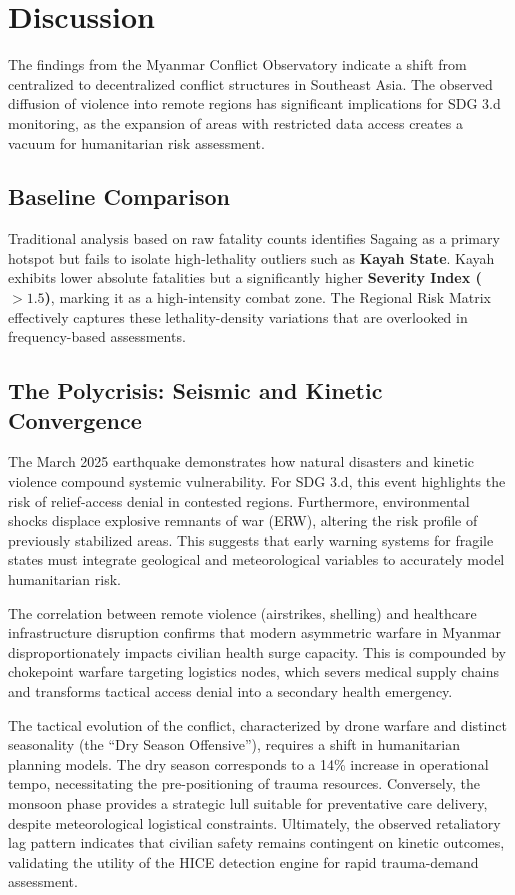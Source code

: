\documentclass[conference]{IEEEtran}
\begin{document}
\section{Discussion} 

The findings from the Myanmar Conflict Observatory indicate a shift from centralized to decentralized conflict structures in Southeast Asia. The observed diffusion of violence into remote regions has significant implications for SDG 3.d monitoring, as the expansion of areas with restricted data access creates a vacuum for humanitarian risk assessment. 

\subsection{Baseline Comparison}
Traditional analysis based on raw fatality counts identifies Sagaing as a primary hotspot but fails to isolate high-lethality outliers such as \textbf{Kayah State}. Kayah exhibits lower absolute fatalities but a significantly higher \textbf{Severity Index ($>1.5$)}, marking it as a high-intensity combat zone. The Regional Risk Matrix effectively captures these lethality-density variations that are overlooked in frequency-based assessments.

\subsection{The Polycrisis: Seismic and Kinetic Convergence}
The March 2025 earthquake demonstrates how natural disasters and kinetic violence compound systemic vulnerability. For SDG 3.d, this event highlights the risk of relief-access denial in contested regions. Furthermore, environmental shocks displace explosive remnants of war (ERW), altering the risk profile of previously stabilized areas. This suggests that early warning systems for fragile states must integrate geological and meteorological variables to accurately model humanitarian risk.

The correlation between remote violence (airstrikes, shelling) and healthcare infrastructure disruption confirms that modern asymmetric warfare in Myanmar disproportionately impacts civilian health surge capacity. This is compounded by chokepoint warfare targeting logistics nodes, which severs medical supply chains and transforms tactical access denial into a secondary health emergency.

The tactical evolution of the conflict, characterized by drone warfare and distinct seasonality (the ``Dry Season Offensive''), requires a shift in humanitarian planning models. The dry season corresponds to a 14\% increase in operational tempo, necessitating the pre-positioning of trauma resources. Conversely, the monsoon phase provides a strategic lull suitable for preventative care delivery, despite meteorological logistical constraints. Ultimately, the observed retaliatory lag pattern indicates that civilian safety remains contingent on kinetic outcomes, validating the utility of the HICE detection engine for rapid trauma-demand assessment.
\end{document}
